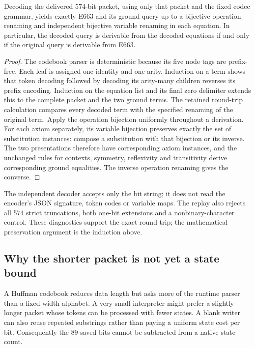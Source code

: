 \begin{proposition}
Decoding the delivered 574-bit packet, using only that packet and the
fixed codec grammar, yields exactly E663 and its ground query up to a
bijective operation renaming and independent bijective variable
renaming in each equation. In particular, the decoded query is derivable
from the decoded equations if and only if the original query is derivable
from E663.
\end{proposition}
\begin{proof}
The codebook parser is deterministic because its five node tags are
prefix-free. Each leaf is assigned one identity and one arity. Induction
on a term shows that token decoding followed by decoding its arity-many
children reverses its prefix encoding. Induction on the equation list
and its final zero delimiter extends this to the complete packet and
the two ground terms. The retained round-trip calculation compares
every decoded term with the specified renaming of the original term.
Apply the operation bijection uniformly throughout a derivation. For
each axiom separately, its variable bijection preserves exactly the
set of substitution instances: compose a substitution with that
bijection or its inverse. The two presentations therefore have
corresponding axiom instances, and the unchanged rules for contexts,
symmetry, reflexivity and transitivity derive corresponding ground
equalities. The inverse operation renaming gives the converse.
\end{proof}

The independent decoder accepts only the bit string; it does not read
the encoder's JSON signature, token codes or variable maps. The replay
also rejects all 574 strict truncations, both one-bit extensions and
a nonbinary-character control. These diagnostics support the exact
round trip; the mathematical preservation argument is the induction
above.

\subsection{Why the shorter packet is not yet a state bound}

A Huffman codebook reduces data length but asks more of the runtime
parser than a fixed-width alphabet. A very small interpreter might
prefer a slightly longer packet whose tokens can be processed with
fewer states. A blank writer can also reuse repeated substrings rather
than paying a uniform state cost per bit. Consequently the 89 saved
bits cannot be subtracted from a native state count.

